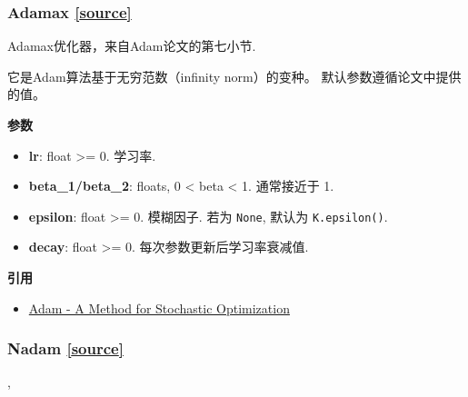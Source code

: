 \subsubsection{Adamax {\href{https://github.com/keras-team/keras/blob/master/keras/optimizers.py\#L486}{{[}source{]}}}}

\begin{Shaded}
\begin{Highlighting}[]
\OperatorTok{=}\OperatorTok{=}\OperatorTok{=}\OperatorTok{=}\OperatorTok{=}\NormalTok{)}
\end{Highlighting}
\end{Shaded}

Adamax优化器，来自Adam论文的第七小节.

它是Adam算法基于无穷范数（infinity norm）的变种。
默认参数遵循论文中提供的值。

\textbf{参数}

\begin{itemize}
\tightlist
\item
  \textbf{lr}: float \textgreater{}= 0. 学习率.
\item
  \textbf{beta\_1/beta\_2}: floats, 0 \textless{} beta \textless{} 1.
  通常接近于 1.
\item
  \textbf{epsilon}: float \textgreater{}= 0. 模糊因子. 若为
  \texttt{None}, 默认为 \texttt{K.epsilon()}.
\item
  \textbf{decay}: float \textgreater{}= 0. 每次参数更新后学习率衰减值.
\end{itemize}

\textbf{引用}

\begin{itemize}
\tightlist
\item
  \href{http://arxiv.org/abs/1412.6980v8}{Adam - A Method for Stochastic
  Optimization}
\end{itemize}




\subsubsection{Nadam {\href{https://github.com/keras-team/keras/blob/master/keras/optimizers.py\#L563}{{[}source{]}}}}

\begin{Shaded}
\begin{Highlighting}[]
\OperatorTok{=}\OperatorTok{=}\OperatorTok{=}\OperatorTok{=}, \\
\hspace{4cm}\OperatorTok{=}\NormalTok{)}
\end{Highlighting}
\end{Shaded}

